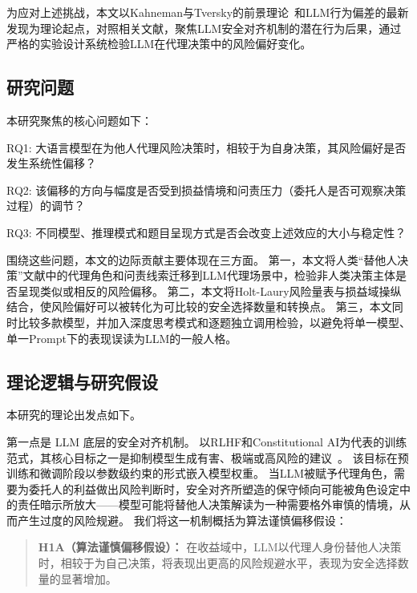 为应对上述挑战，本文以Kahneman与Tversky的前景理论~\cite{Kahneman1979Prospect}和LLM行为偏差的最新发现为理论起点，对照相关文献，聚焦LLM安全对齐机制的潜在行为后果，通过严格的实验设计系统检验LLM在代理决策中的风险偏好变化。

\subsection{研究问题}

本研究聚焦的核心问题如下：

RQ1: 大语言模型在为他人代理风险决策时，相较于为自身决策，其风险偏好是否发生系统性偏移？

RQ2: 该偏移的方向与幅度是否受到损益情境和问责压力（委托人是否可观察决策过程）的调节？

RQ3: 不同模型、推理模式和题目呈现方式是否会改变上述效应的大小与稳定性？

围绕这些问题，本文的边际贡献主要体现在三方面。
第一，本文将人类“替他人决策”文献中的代理角色和问责线索迁移到LLM代理场景中，检验非人类决策主体是否呈现类似或相反的风险偏移。
第二，本文将Holt-Laury风险量表与损益域操纵结合，使风险偏好可以被转化为可比较的安全选择数量和转换点。
第三，本文同时比较多款模型，并加入深度思考模式和逐题独立调用检验，以避免将单一模型、单一Prompt下的表现误读为LLM的一般人格。

\subsection{理论逻辑与研究假设}

本研究的理论出发点如下。

第一点是 LLM 底层的安全对齐机制。
以RLHF和Constitutional AI为代表的训练范式，其核心目标之一是抑制模型生成有害、极端或高风险的建议~\cite{Ouyang2022Training,Bai2022Constitutional}。
该目标在预训练和微调阶段以参数级约束的形式嵌入模型权重。
当LLM被赋予代理角色，需要为委托人的利益做出风险判断时，安全对齐所塑造的保守倾向可能被角色设定中的责任暗示所放大——模型可能将替他人决策解读为一种需要格外审慎的情境，从而产生过度的风险规避。
我们将这一机制概括为算法谨慎偏移假设：
\begin{quote}
\textbf{H1A（算法谨慎偏移假设）：} 在收益域中，LLM以代理人身份替他人决策时，相较于为自己决策，将表现出更高的风险规避水平，表现为安全选择数量的显著增加。
\end{quote}

